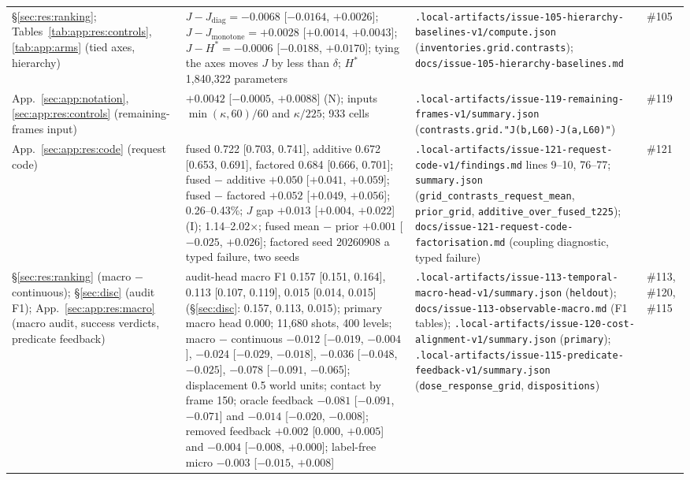 {\begin{revblock}
\begin{longtable}{@{}>{\raggedright\arraybackslash}p{}>{\raggedright\arraybackslash}p{}>{\raggedright\arraybackslash}p{}>{\raggedright\arraybackslash}p{}@{}}
\S\ref{sec:res:ranking}; Tables~\ref{tab:app:res:controls}, \ref{tab:app:arms} (tied axes, hierarchy) & $J-J_{\mathrm{diag}}=-0.0068$ [$-0.0164$, $+0.0026$]; $J-J_{\mathrm{monotone}}=+0.0028$ [$+0.0014$, $+0.0043$]; $J-H^{*}=-0.0006$ [$-0.0188$, $+0.0170$]; tying the axes moves $J$ by less than $\delta$; $H^{*}$ 1,840,322 parameters & \nolinkurl{.local-artifacts/issue-105-hierarchy-baselines-v1/compute.json} (\nolinkurl{inventories.grid.contrasts}); \nolinkurl{docs/issue-105-hierarchy-baselines.md} & \#105 \\
App.~\ref{sec:app:notation}, \ref{sec:app:res:controls} (remaining-frames input) & $+0.0042$ [$-0.0005$, $+0.0088$] (N); inputs $\min(\kappa,60)/60$ and $\kappa/225$; 933 cells & \nolinkurl{.local-artifacts/issue-119-remaining-frames-v1/summary.json} (\nolinkurl{contrasts.grid."J(b,L60)-J(a,L60)"}) & \#119 \\
App.~\ref{sec:app:res:code} (request code) & fused 0.722 [0.703, 0.741], additive 0.672 [0.653, 0.691], factored 0.684 [0.666, 0.701]; fused $-$ additive $+0.050$ [$+0.041$, $+0.059$]; fused $-$ factored $+0.052$ [$+0.049$, $+0.056$]; 0.26--0.43\%; $J$ gap $+0.013$ [$+0.004$, $+0.022$] (I); 1.14--2.02$\times$; fused mean $-$ prior $+0.001$ [$-0.025$, $+0.026$]; factored seed 20260908 a typed failure, two seeds & \nolinkurl{.local-artifacts/issue-121-request-code-v1/findings.md} lines 9--10, 76--77; \nolinkurl{summary.json} (\nolinkurl{grid_contrasts_request_mean}, \nolinkurl{prior_grid}, \nolinkurl{additive_over_fused_t225}); \nolinkurl{docs/issue-121-request-code-factorisation.md} (coupling diagnostic, typed failure) & \#121 \\
\S\ref{sec:res:ranking} (macro $-$ continuous); \S\ref{sec:disc} (audit F1); App.~\ref{sec:app:res:macro} (macro audit, success verdicts, predicate feedback) & audit-head macro F1 0.157 [0.151, 0.164], 0.113 [0.107, 0.119], 0.015 [0.014, 0.015] (\S\ref{sec:disc}: 0.157, 0.113, 0.015); primary macro head 0.000; 11,680 shots, 400 levels; macro $-$ continuous $-0.012$ [$-0.019$, $-0.004$], $-0.024$ [$-0.029$, $-0.018$], $-0.036$ [$-0.048$, $-0.025$], $-0.078$ [$-0.091$, $-0.065$]; displacement 0.5 world units; contact by frame 150; oracle feedback $-0.081$ [$-0.091$, $-0.071$] and $-0.014$ [$-0.020$, $-0.008$]; removed feedback $+0.002$ [$0.000$, $+0.005$] and $-0.004$ [$-0.008$, $+0.000$]; label-free micro $-0.003$ [$-0.015$, $+0.008$] & \nolinkurl{.local-artifacts/issue-113-temporal-macro-head-v1/summary.json} (\nolinkurl{heldout}); \nolinkurl{docs/issue-113-observable-macro.md} (F1 tables); \nolinkurl{.local-artifacts/issue-120-cost-alignment-v1/summary.json} (\nolinkurl{primary}); \nolinkurl{.local-artifacts/issue-115-predicate-feedback-v1/summary.json} (\nolinkurl{dose_response_grid}, \nolinkurl{dispositions}) & \#113, \#120, \#115 \\

\end{longtable}
\end{revblock}}
